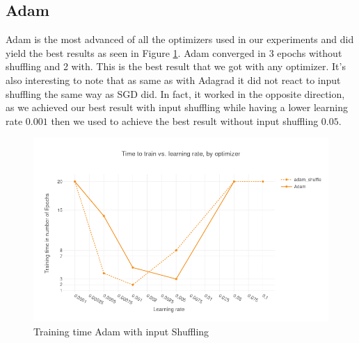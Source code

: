 \subsection{Adam}
Adam is the most advanced of all the optimizers used in our experiments and did yield the best results as seen in Figure \ref{fig:results_adam_shuffle}. Adam converged in 3 epochs without shuffling and 2 with. This is the best result that we got with any optimizer.  It's also interesting to note that as same as with Adagrad it did not react to input shuffling the same way as SGD did. In fact, it worked in the opposite direction, as we achieved our best result with input shuffling while having a lower learning rate $0.001$ then we used to achieve the best result without input shuffling $0.05$.
\begin{figure}[h]
    \centering
            \includegraphics[scale=0.45]{images/results_adam_shuffle} 
    \caption{Training time Adam with input Shuffling}
    \label{fig:results_adam_shuffle}
\end{figure}